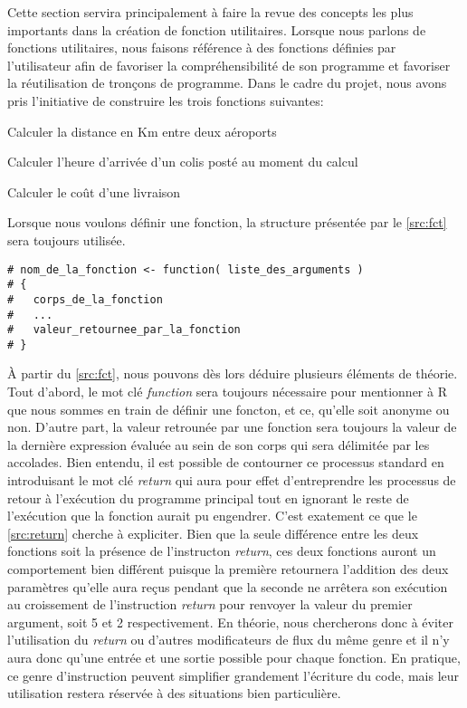 Cette section servira principalement à faire la revue des concepts les plus importants dans la création de fonction utilitaires. Lorsque nous parlons de fonctions utilitaires, nous faisons référence à des fonctions définies par l'utilisateur afin de favoriser la compréhensibilité de son programme et favoriser la réutilisation de tronçons de programme. Dans le cadre du projet, nous avons pris l'initiative de construire les trois fonctions suivantes: \\
\begin{description}[style=multiline,leftmargin=2.5cm]
	\item[airportsDist] Calculer la distance en Km entre deux aéroports
	\item[arrivalTime] Calculer l'heure d'arrivée d'un colis posté au moment du calcul
	\item[shippingCost] Calculer le coût d'une livraison
\end{description}

\noindent
Lorsque nous voulons définir une fonction, la structure présentée par le \autoref{src:fct} sera toujours utilisée. 

\begin{lstlisting}[caption = Structure pour la définition d'une fonction,label=src:fct]
# nom_de_la_fonction <- function( liste_des_arguments )
# {
# 	corps_de_la_fonction
# 	...
#	valeur_retournee_par_la_fonction
# }
\end{lstlisting}

\vspace{\baselineskip}
\noindent
À partir du \autoref{src:fct}, nous pouvons dès lors déduire plusieurs éléments de théorie. Tout d'abord, le mot clé \emph{function} sera toujours nécessaire pour mentionner à R que nous sommes en train de définir une foncton, et ce, qu'elle soit anonyme ou non. D'autre part, la valeur retrounée par une fonction sera toujours la valeur de la dernière expression évaluée au sein de son corps qui sera délimitée par les accolades. Bien entendu, il est possible de contourner ce processus standard en introduisant le mot clé \emph{return} qui aura pour effet d'entreprendre les processus de retour à l'exécution du programme principal tout en ignorant le reste de l'exécution que la fonction aurait pu engendrer. C'est exatement ce que le \autoref{src:return} cherche à expliciter. Bien que la seule différence entre les deux fonctions soit la présence de l'instructon \emph{return}, ces deux fonctions auront un comportement bien différent puisque la première retournera l'addition des deux paramètres qu'elle aura reçus pendant que la seconde ne arrêtera son exécution au croissement de l'instruction \emph{return} pour renvoyer la valeur du premier argument, soit 5 et 2 respectivement. En théorie, nous chercherons donc à éviter l'utilisation du \emph{return} ou d'autres modificateurs de flux du même genre et il n'y aura donc qu'une entrée et une sortie possible pour chaque fonction. En pratique, ce genre d'instruction peuvent simplifier grandement l'écriture du code, mais leur utilisation restera réservée à des situations bien particulière.

